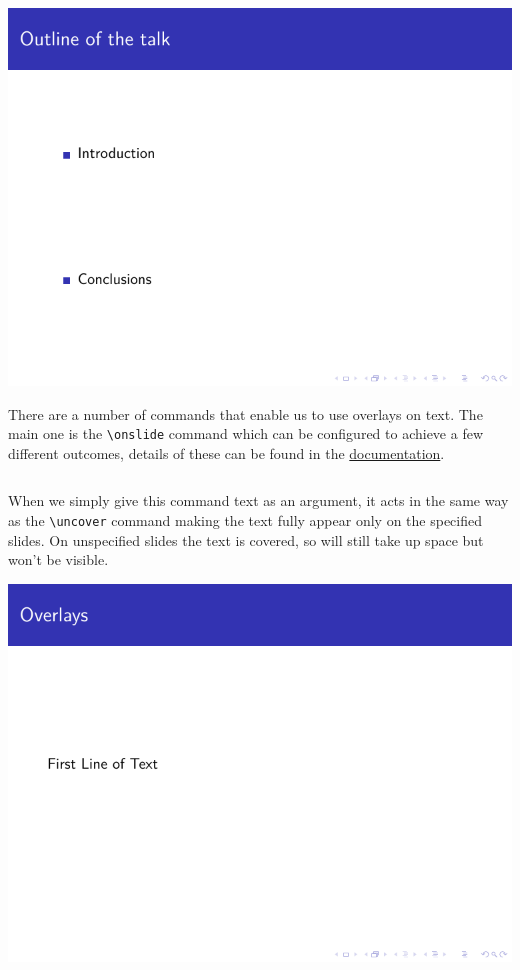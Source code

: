 \begin{column}{0.5\textwidth}
\includegraphics[page=1]{examples/beamer/beameroverlay03.pdf}

There are a number of commands that enable us to use overlays on text. The main one is the \verb|\onslide| command which can be configured to achieve a few different outcomes, details of these can be found in the \href{http://mirrors.ctan.org/macros/latex/contrib/beamer/doc/beameruserguide.pdf}{documentation}.

\inputminted[linenos=true]{latex}{examples/beamer/beameroverlay04.tex}

When we simply give this command text as an argument, it acts in the same way as the \verb|\uncover| command making the text fully appear only on the specified slides. On unspecified slides the text is covered, so will still take up space but won't be visible.

\includegraphics[page=1]{examples/beamer/beameroverlay04.pdf}


\end{column}
